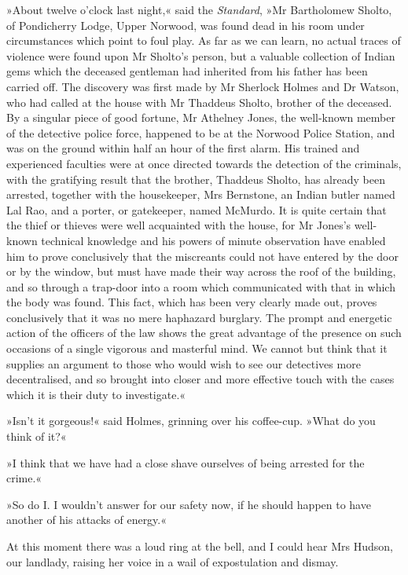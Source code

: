 »About twelve o'clock last night,« said the \textit{Standard}, »Mr Bartholomew Sholto, of Pondicherry Lodge, Upper Norwood, was found dead in his room under circumstances which point to foul play. As far as we can learn, no actual traces of violence were found upon Mr Sholto's person, but a valuable collection of Indian gems which the deceased gentleman had inherited from his father has been carried off. The discovery was first made by Mr Sherlock Holmes and Dr Watson, who had called at the house with Mr Thaddeus Sholto, brother of the deceased. By a singular piece of good fortune, Mr Athelney Jones, the well-known member of the detective police force, happened to be at the Norwood Police Station, and was on the ground within half an hour of the first alarm. His trained and experienced faculties were at once directed towards the detection of the criminals, with the gratifying result that the brother, Thaddeus Sholto, has already been arrested, together with the housekeeper, Mrs Bernstone, an Indian butler named Lal Rao, and a porter, or gatekeeper, named McMurdo. It is quite certain that the thief or thieves were well acquainted with the house, for Mr Jones's well-known technical knowledge and his powers of minute observation have enabled him to prove conclusively that the miscreants could not have entered by the door or by the window, but must have made their way across the roof of the building, and so through a trap-door into a room which communicated with that in which the body was found. This fact, which has been very clearly made out, proves conclusively that it was no mere haphazard burglary. The prompt and energetic action of the officers of the law shows the great advantage of the presence on such occasions of a single vigorous and masterful mind. We cannot but think that it supplies an argument to those who would wish to see our detectives more decentralised, and so brought into closer and more effective touch with the cases which it is their duty to investigate.«

»Isn't it gorgeous!« said Holmes, grinning over his coffee-cup. »What do you think of it?«

»I think that we have had a close shave ourselves of being arrested for the crime.«

»So do I. I wouldn't answer for our safety now, if he should happen to have another of his attacks of energy.«

At this moment there was a loud ring at the bell, and I could hear Mrs Hudson, our landlady, raising her voice in a wail of expostulation and dismay.

